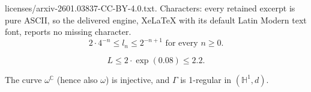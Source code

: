 \documentclass[10pt,a4paper]{amsart}
\newcommand{\C}{\mathbb C}
\renewcommand{\geq}{\geqslant}
\renewcommand{\leq}{\leqslant}
\begin{document}
licenses/arxiv-2601.03837-CC-BY-4.0.txt. Characters: every retained excerpt is pure ASCII, so the delivered engine, XeLaTeX with its default Latin Modern text font, reports no missing character.
\begin{equation}\label{eq:**}
    2\cdot4^{-n}\leq l_n\leq 2^{-n+1}\text{ for every }n\geq 0.
\end{equation}

\begin{equation}\label{eq:*}
    L \leq 2 \cdot \exp(0.08)\leq 2.2.
\end{equation}

\begin{theorem}\label{injective}
    The curve $\omega^\C$ (hence also  $\omega$) is injective, and $\Gamma$ is 1-regular in $(\mathbb{H}^1,d)$.
\end{theorem}
\end{document}
